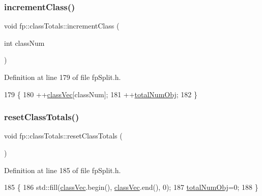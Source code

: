 \subsubsection{\texorpdfstring{increment\+Class()}{incrementClass()}}
{\footnotesize\ttfamily void fp\+::class\+Totals\+::increment\+Class (\begin{DoxyParamCaption}\item[{int}]{class\+Num }\end{DoxyParamCaption})\hspace{0.3cm}{\ttfamily [inline]}}



Definition at line 179 of file fp\+Split.\+h.


\begin{DoxyCode}
179                                                     \{
180                 ++\hyperlink{classfp_1_1classTotals_af96102537592dbda8601d0235dfccfca}{classVec}[classNum];
181                 ++\hyperlink{classfp_1_1classTotals_a97be63e3e4a1b7c553df839034828aae}{totalNumObj};
182             \}
\end{DoxyCode}
\mbox{\label{classfp_1_1classTotals_ab0ad9daa63bc410ae15f344b86386f87}} 
\subsubsection{\texorpdfstring{reset\+Class\+Totals()}{resetClassTotals()}}
{\footnotesize\ttfamily void fp\+::class\+Totals\+::reset\+Class\+Totals (\begin{DoxyParamCaption}{ }\end{DoxyParamCaption})\hspace{0.3cm}{\ttfamily [inline]}}



Definition at line 185 of file fp\+Split.\+h.


\begin{DoxyCode}
185                                           \{
186                 std::fill(\hyperlink{classfp_1_1classTotals_af96102537592dbda8601d0235dfccfca}{classVec}.begin(), \hyperlink{classfp_1_1classTotals_af96102537592dbda8601d0235dfccfca}{classVec}.end(), 0);
187                 \hyperlink{classfp_1_1classTotals_a97be63e3e4a1b7c553df839034828aae}{totalNumObj}=0;
188             \}
\end{DoxyCode}
\mbox{\label{classfp_1_1classTotals_a088c363e5ae669d52e4836bc900d6a73}} 
